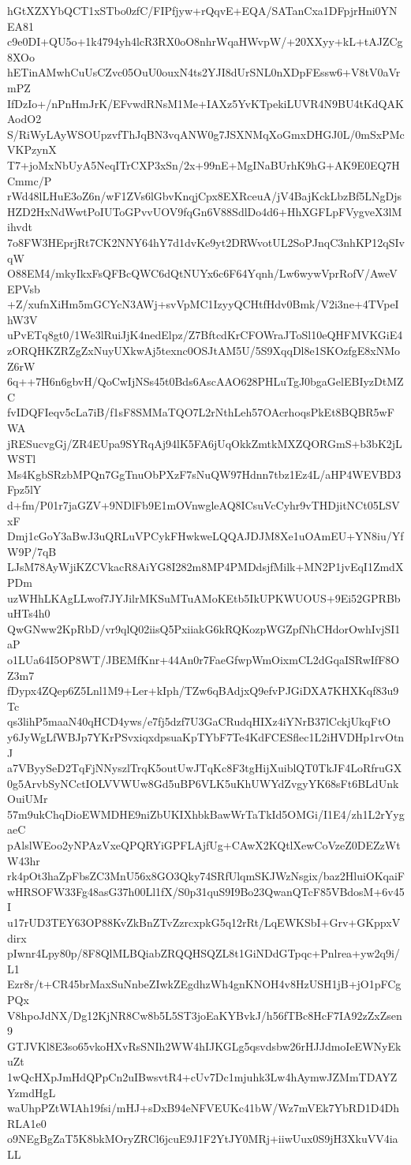 hGtXZXYbQCT1xSTbo0zfC/FIPfjyw+rQqvE+EQA/SATanCxa1DFpjrHni0YNEA81
c9e0DI+QU5o+1k4794yh4lcR3RX0oO8nhrWqaHWvpW/+20XXyy+kL+tAJZCg8XOo
hETinAMwhCuUsCZvc05OuU0ouxN4ts2YJI8dUrSNL0nXDpFEssw6+V8tV0aVrmPZ
IfDzIo+/nPnHmJrK/EFvwdRNsM1Me+IAXz5YvKTpekiLUVR4N9BU4tKdQAKAodO2
S/RiWyLAyWSOUpzvfThJqBN3vqANW0g7JSXNMqXoGmxDHGJ0L/0mSxPMcVKPzynX
T7+joMxNbUyA5NeqITrCXP3xSn/2x+99nE+MgINaBUrhK9hG+AK9E0EQ7HCmmc/P
rWd48lLHuE3oZ6n/wF1ZVs6lGbvKnqjCpx8EXRceuA/jV4BajKckLbzBf5LNgDjs
HZD2HxNdWwtPoIUToGPvvUOV9fqGn6V88SdlDo4d6+HhXGFLpFVygveX3lMihvdt
7o8FW3HEprjRt7CK2NNY64hY7d1dvKe9yt2DRWvotUL2SoPJnqC3nhKP12qSIvqW
O88EM4/mkyIkxFsQFBcQWC6dQtNUYx6c6F64Yqnh/Lw6wywVprRofV/AweVEPVsb
+Z/xufnXiHm5mGCYcN3AWj+svVpMC1IzyyQCHtfHdv0Bmk/V2i3ne+4TVpeIhW3V
uPvETq8gt0/1We3lRuiJjK4nedElpz/Z7BftcdKrCFOWraJToSl10eQHFMVKGiE4
zORQHKZRZgZxNuyUXkwAj5texnc0OSJtAM5U/5S9XqqDl8e1SKOzfgE8xNMoZ6rW
6q++7H6n6gbvH/QoCwIjNSs45t0Bds6AscAAO628PHLuTgJ0bgaGelEBIyzDtMZC
fvIDQFIeqv5cLa7iB/f1sF8SMMaTQO7L2rNthLeh57OAcrhoqsPkEt8BQBR5wFWA
jRESucvgGj/ZR4EUpa9SYRqAj94lK5FA6jUqOkkZmtkMXZQORGmS+b3bK2jLWSTl
Ms4KgbSRzbMPQn7GgTnuObPXzF7sNuQW97Hdnn7tbz1Ez4L/aHP4WEVBD3Fpz5lY
d+fm/P01r7jaGZV+9NDlFb9E1mOVnwgleAQ8ICsuVcCyhr9vTHDjitNCt05LSVxF
Dmj1cGoY3aBwJ3uQRLuVPCykFHwkweLQQAJDJM8Xe1uOAmEU+YN8iu/YfW9P/7qB
LJsM78AyWjiKZCVkacR8AiYG8I282m8MP4PMDdsjfMilk+MN2P1jvEqI1ZmdXPDm
uzWHhLKAgLLwof7JYJilrMKSuMTuAMoKEtb5IkUPKWUOUS+9Ei52GPRBbuHTs4h0
QwGNww2KpRbD/vr9qlQ02iisQ5PxiiakG6kRQKozpWGZpfNhCHdorOwhIvjSI1aP
o1LUa64I5OP8WT/JBEMfKnr+44An0r7FaeGfwpWmOixmCL2dGqaISRwIfF8OZ3m7
fDypx4ZQep6Z5Lnl1M9+Ler+kIph/TZw6qBAdjxQ9efvPJGiDXA7KHXKqf83u9Tc
qs3lihP5maaN40qHCD4yws/e7fj5dzf7U3GaCRudqHIXz4iYNrB37lCckjUkqFtO
y6JyWgLfWBJp7YKrPSvxiqxdpsuaKpTYbF7Te4KdFCESflec1L2iHVDHp1rvOtnJ
a7VByySeD2TqFjNNyszlTrqK5outUwJTqKc8F3tgHijXuiblQT0TkJF4LoRfruGX
0g5ArvbSyNCctIOLVVWUw8Gd5uBP6VLK5uKhUWYdZvgyYK68sFt6BLdUnkOuiUMr
57m9ukChqDioEWMDHE9niZbUKIXhbkBawWrTaTkId5OMGi/I1E4/zh1L2rYygaeC
pAlslWEoo2yNPAzVxeQPQRYiGPFLAjfUg+CAwX2KQtlXewCoVzeZ0DEZzWtW43hr
rk4pOt3haZpFbsZC3MnU56x8GO3Qky74SRfUlqmSKJWzNsgix/baz2HluiOKqaiF
wHRSOFW33Fg48asG37h00Ll1fX/S0p31quS9I9Bo23QwanQTcF85VBdosM+6v45I
u17rUD3TEY63OP88KvZkBnZTvZzrcxpkG5q12rRt/LqEWKSbI+Grv+GKppxVdirx
pIwnr4Lpy80p/8F8QlMLBQiabZRQQHSQZL8t1GiNDdGTpqc+Pnlrea+yw2q9i/L1
Ezr8r/t+CR45brMaxSuNnbeZIwkZEgdhzWh4gnKNOH4v8HzUSH1jB+jO1pFCgPQx
V8hpoJdNX/Dg12KjNR8Cw8b5L5ST3joEaKYBvkJ/h56fTBc8HcF7IA92zZxZsen9
GTJVKl8E3so65vkoHXvRsSNIh2WW4hIJKGLg5qsvdsbw26rHJJdmoIeEWNyEkuZt
1wQcHXpJmHdQPpCn2uIBwsvtR4+cUv7Dc1mjuhk3Lw4hAymwJZMmTDAYZYzmdHgL
waUhpPZtWIAh19fsi/mHJ+sDxB94eNFVEUKc41bW/Wz7mVEk7YbRD1D4DhRLA1e0
o9NEgBgZaT5K8bkMOryZRCl6jcuE9J1F2YtJY0MRj+iiwUux0S9jH3XkuVV4iaLL
